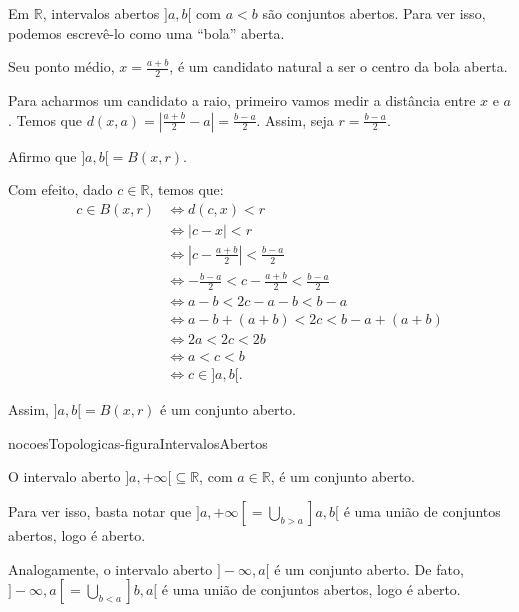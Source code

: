 \begin{example}\label{exemplo:intervalos-abertos-sao-abertos}
    Em $\mathbb R$, intervalos abertos $]a, b[$ com $a<b$ são conjuntos abertos.
    Para ver isso, podemos escrevê-lo como uma ``bola'' aberta.
    
    Seu ponto médio, $x=\frac{a+b}{2}$, é um candidato natural a ser o centro da bola aberta.

    Para acharmos um candidato a raio, primeiro vamos medir a distância entre $x$ e $a$.
    Temos que $d(x, a) = \left|\frac{a+b}{2} - a\right| = \frac{b-a}{2}$.
    Assim, seja $r = \frac{b-a}{2}$.

    Afirmo que $]a, b[=B(x, r)$.

    Com efeito, dado $c \in \mathbb R$, temos que:
    \begin{align*}
        c \in B(x, r) &\Leftrightarrow d(c, x) < r \\
        &\Leftrightarrow |c-x| < r \\
        &\Leftrightarrow |c-\frac{a+b}{2}| < \frac{b-a}{2} \\
        &\Leftrightarrow -\frac{b-a}{2} < c-\frac{a+b}{2} < \frac{b-a}{2} \\
        &\Leftrightarrow a-b< 2c - a - b < b-a \\
        &\Leftrightarrow a-b+(a+b) < 2c < b-a+(a+b) \\
        &\Leftrightarrow 2a< 2c < 2b \\
        &\Leftrightarrow a < c < b \\
        &\Leftrightarrow c \in ]a, b[.
    \end{align*}

    Assim, $]a, b[=B(x, r)$ é um conjunto aberto.
\end{example}

{nocoesTopologicas-figuraIntervalosAbertos}

\begin{example}
    O intervalo aberto $]a, +\infty[\subseteq \mathbb R$, com $a \in \mathbb R$, é um conjunto aberto.
    
    Para ver isso, basta notar que $]a, +\infty[ = \bigcup_{b>a} ]a, b[$ é uma união de conjuntos abertos, logo é aberto.

    Analogamente, o intervalo aberto $]-\infty, a[$ é um conjunto aberto.
    De fato, $]-\infty, a[ = \bigcup_{b<a} ]b, a[$ é uma união de conjuntos abertos, logo é aberto.
\end{example}

